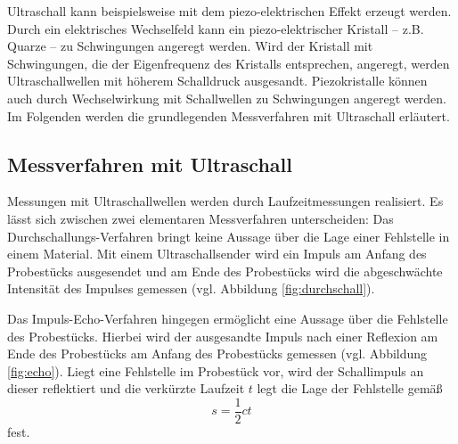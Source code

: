 Ultraschall kann beispielsweise mit dem piezo-elektrischen Effekt erzeugt werden.
Durch ein elektrisches Wechselfeld kann ein piezo-elektrischer Kristall -- z.B. Quarze -- zu
Schwingungen angeregt werden. Wird der Kristall mit
Schwingungen, die der Eigenfrequenz des Kristalls entsprechen, angeregt, werden
Ultraschallwellen mit höherem Schalldruck ausgesandt. Piezokristalle können auch durch
Wechselwirkung mit Schallwellen zu Schwingungen angeregt werden.
Im Folgenden werden die grundlegenden Messverfahren mit Ultraschall erläutert.
\subsection{Messverfahren mit Ultraschall}
Messungen mit Ultraschallwellen werden durch Laufzeitmessungen realisiert.
Es lässt sich zwischen zwei elementaren Messverfahren unterscheiden:
Das Durchschallungs-Verfahren bringt keine Aussage über die Lage einer Fehlstelle in einem
Material. Mit einem Ultraschallsender wird ein Impuls am Anfang des Probestücks ausgesendet
und am Ende des Probestücks wird die abgeschwächte Intensität des Impulses gemessen (vgl.
Abbildung \ref{fig:durchschall}).

Das Impuls-Echo-Verfahren hingegen ermöglicht eine Aussage über die Fehlstelle des Probestücks.
Hierbei wird der ausgesandte Impuls nach einer Reflexion am Ende des Probestücks am Anfang des
Probestücks gemessen (vgl. Abbildung \ref{fig:echo}).
Liegt eine Fehlstelle im Probestück vor, wird der Schallimpuls an dieser reflektiert und die
verkürzte Laufzeit $t$ legt die Lage der Fehlstelle gemäß
\begin{equation}
	\label{eqn:laufzeit}
	s = \frac{1}{2} c t
\end{equation}
fest.



\cite{Anleitung}
